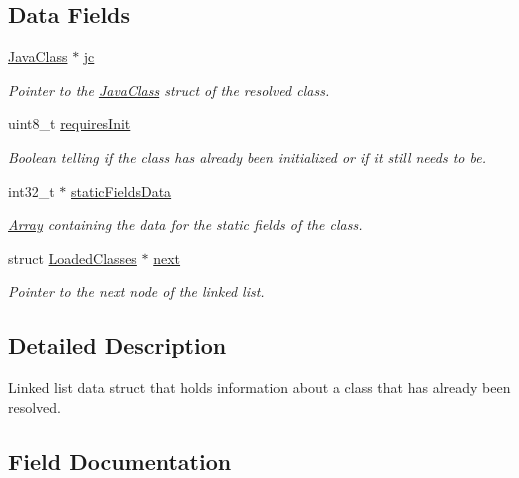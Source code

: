 \subsection*{Data Fields}
\begin{DoxyCompactItemize}
\item 
\hyperlink{structJavaClass}{Java\+Class} $\ast$ \hyperlink{structLoadedClasses_a9926f0f305ae1f117b2709b17c9084d8}{jc}
\begin{DoxyCompactList}\small\item\em Pointer to the \hyperlink{structJavaClass}{Java\+Class} struct of the resolved class. \end{DoxyCompactList}\item 
uint8\+\_\+t \hyperlink{structLoadedClasses_a4b06b6533c15ba1e1634b1e768343a84}{requires\+Init}
\begin{DoxyCompactList}\small\item\em Boolean telling if the class has already been initialized or if it still needs to be. \end{DoxyCompactList}\item 
int32\+\_\+t $\ast$ \hyperlink{structLoadedClasses_adcf48dbaaaea57b514d53a8b5a3edafe}{static\+Fields\+Data}
\begin{DoxyCompactList}\small\item\em \hyperlink{structArray}{Array} containing the data for the static fields of the class. \end{DoxyCompactList}\item 
struct \hyperlink{structLoadedClasses}{Loaded\+Classes} $\ast$ \hyperlink{structLoadedClasses_a66c15555a97e890e2967fac61bb540b8}{next}
\begin{DoxyCompactList}\small\item\em Pointer to the next node of the linked list. \end{DoxyCompactList}\end{DoxyCompactItemize}


\subsection{Detailed Description}
Linked list data struct that holds information about a class that has already been resolved. 

\subsection{Field Documentation}
